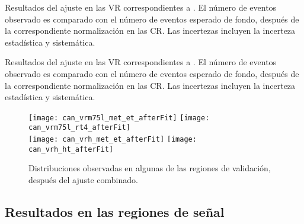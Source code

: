 \begin{table}[!htb]

  \caption{Resultados del ajuste en las VR correspondientes a {\SRL}.
    El número de eventos observado es comparado con el número de eventos esperado de fondo, después de la correspondiente
    normalización en las CR. Las incertezas incluyen la incerteza estadística y sistemática.}
  \label{tab:fit_result_vrl}

  

  \bigskip

  

\end{table}


\begin{table}[!htb]

  \caption{Resultados del ajuste en las VR correspondientes a {\SRH}.
    El número de eventos observado es comparado con el número de eventos esperado de fondo, después de la correspondiente
    normalización en las CR. Las incertezas incluyen la incerteza estadística y sistemática.}
  \label{tab:fit_result_vrh}

  

  \bigskip

  

\end{table}


\begin{figure}[!htbp]
  \centering

  \texttt{[image: can\_vrm75l\_met\_et\_afterFit]}
  \texttt{[image: can\_vrm75l\_rt4\_afterFit]} \\

  \texttt{[image: can\_vrh\_met\_et\_afterFit]}
  \texttt{[image: can\_vrh\_ht\_afterFit]} \\

  \caption{Distribuciones observadas en algunas de las regiones de validación, después del ajuste combinado.}
  \label{fig:bkgfit_vr}

\end{figure}




\subsection{Resultados en las regiones de señal}

